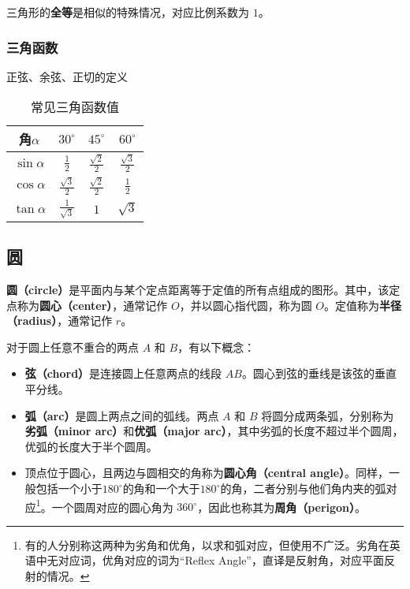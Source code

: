 三角形的\textbf{全等}是相似的特殊情况，对应比例系数为 $1$。

\subsubsection{三角函数}

正弦、余弦、正切的定义

\begin{table}[ht]
\centering
\caption{常见三角函数值}\label{tab_HsGeBa1}
\begin{tabular}{|c|c|c|c|}
\hline
角$\alpha$ & $30^{\circ}$ & $45^{\circ}$ & $60^{\circ}$ \\
\hline
$\sin\alpha$ & $\displaystyle\frac{1}{2}$ & $\displaystyle\frac{\sqrt{2}}{2}$ & $\displaystyle\frac{\sqrt{3}}{2}$ \\
\hline
$\cos\alpha$ & $\displaystyle\frac{\sqrt{3}}{2}$& $\displaystyle\frac{\sqrt{2}}{2}$ &  $\displaystyle\frac{1}{2}$ \\
\hline
$\tan\alpha$ & $\displaystyle\frac{1}{\sqrt{3}}$ & $1$ & $\sqrt{3}$ \\
\hline
\end{tabular}
\end{table}
\subsection{圆}\label{sub_HsGeBa_1}

\textbf{圆（circle）}是平面内与某个定点距离等于定值的所有点组成的图形。其中，该定点称为\textbf{圆心（center）}，通常记作 $O$，并以圆心指代圆，称为圆 $O$。定值称为\textbf{半径（radius）}，通常记作 $r$。

对于圆上任意不重合的两点 $A$ 和 $B$，有以下概念：
\begin{itemize}
\item \textbf{弦（chord）}是连接圆上任意两点的线段 $AB$。圆心到弦的垂线是该弦的垂直平分线。
\item \textbf{弧（arc）}是圆上两点之间的弧线。两点 $A$ 和 $B$ 将圆分成两条弧，分别称为\textbf{劣弧（minor arc）}和\textbf{优弧（major arc）}，其中劣弧的长度不超过半个圆周，优弧的长度大于半个圆周。
\item 顶点位于圆心，且两边与圆相交的角称为\textbf{圆心角（central angle）}。同样，一般包括一个小于$180^\circ$的角和一个大于$180^\circ$的角，二者分别与他们角内夹的弧对应\footnote{有的人分别称这两种为劣角和优角，以求和弧对应，但使用不广泛。劣角在英语中无对应词，优角对应的词为“Reflex Angle”，直译是反射角，对应平面反射的情况。}。一个圆周对应的圆心角为 $360^\circ$，因此也称其为\textbf{周角（perigon）}。
\end{itemize}

